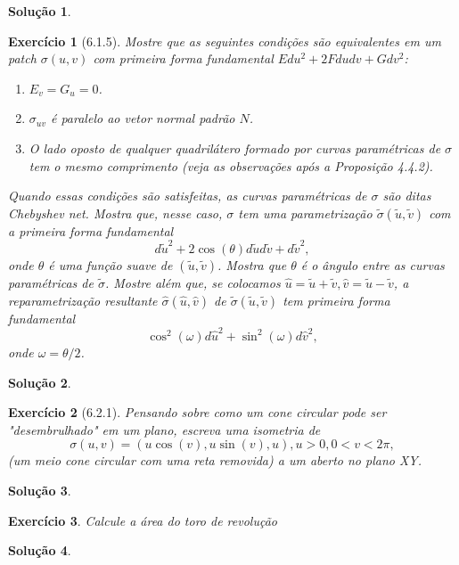 \documentclass[a4paper,12pt]{article}
\theoremstyle{exer}
\newtheorem{exercise}{Exercício}
\theoremstyle{definition}
\newtheorem{solution}{Solução}
\theoremstyle{plain}
\begin{document}
\begin{solution}

\end{solution}

\begin{exercise}[6.1.5]
    Mostre que as seguintes condições são equivalentes em um patch $\sigma(u,
    v)$ com primeira forma fundamental $Edu^2 + 2F dudv + Gdv^2$:
    \begin{enumerate}
        \item[(i)] $E_v = G_u = 0$.
        \item[(ii)] $\sigma_{uv}$ é paralelo ao vetor normal padrão $N$. 
        \item[(iii)] O lado oposto de qualquer quadrilátero formado por curvas
        paramétricas de $\sigma$ tem o mesmo comprimento (veja as observações após a Proposição 4.4.2).   
    \end{enumerate}
    Quando essas condições são satisfeitas, as curvas paramétricas de $\sigma$
    são ditas {\em Chebyshev net.} Mostra que, nesse caso, $\sigma$ tem uma
    parametrização $\tilde{\sigma}(\tilde{u}, \tilde{v})$ com a primeira forma
    fundamental 
    $$
    d\tilde{u}^2 + 2\cos(\theta)d\tilde{u}d\tilde{v} + d\tilde{v}^2,
    $$
    onde $\theta$ é uma função suave de $(\tilde{u}, \tilde{v})$. Mostra que
    $\theta$ é o ângulo entre as curvas paramétricas de $\tilde{\sigma}$.
    Mostre além que, se colocamos $\hat{u} = \tilde{u} + \tilde{v}, \hat{v} =
    \tilde{u} - \tilde{v}$, a reparametrização resultante
    $\hat{\sigma}(\hat{u}, \hat{v})$ de $\tilde{\sigma}(\tilde{u}, \tilde{v})$
    tem primeira forma fundamental 
    $$
    \cos^2(\omega)d\hat{u}^2 + \sin^2(\omega)d\hat{v}^2, 
    $$
    onde $\omega = \theta/2$. 
\end{exercise}

\begin{solution}

\end{solution}

\begin{exercise}[6.2.1]
    Pensando sobre como um cone circular pode ser "desembrulhado" em um plano,
    escreva uma isometria de 
    $$
    \sigma(u,v) = (u\cos(v), u\sin(v), u), u > 0, 0 < v < 2\pi,
    $$
    (um meio cone circular com uma reta removida) a um aberto no plano XY. 
\end{exercise}

\begin{solution}

\end{solution}

\begin{exercise}
    Calcule a área do toro de revolução
\end{exercise}

\begin{solution}

\end{solution}

\end{document}
